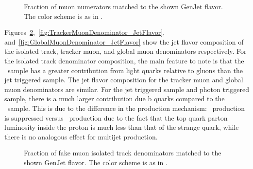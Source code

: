 \documentclass{cmspaper}
\begin{document}
\begin{figure}[htb]
\begin{center}
   \caption{Fraction of muon numerators matched to the shown GenJet flavor. The color scheme is as in .}
   \label{fig:MuonNumerator_JetFlavor}
\end{center}
\end{figure}


Figures~\ref{fig:IsoTrackMuonDenominator_JetFlavor},~\ref{fig:TrackerMuonDenominator_JetFlavor}, and~\ref{fig:GlobalMuonDenominator_JetFlavor} show the jet flavor composition of the isolated track, tracker muon, and global muon denominators respectively. For the isolated track denominator composition, the main feature to note is that the \WPlusJets\ sample has a greater contribution from light quarks relative to gluons than the jet triggered sample. The jet flavor composition for the tracker muon and global muon denominators are similar. For the jet triggered sample and photon triggered sample, there is a much larger contribution due b quarks compared to the \WPlusJets\ sample. This is due to the difference in the production mechanism: \Wb\ production is suppressed versus \Wc\ production due to the fact that the top quark parton luminosity inside the proton is much less than that of the strange quark, while there is no analogous effect for multijet production. 

\begin{figure}[htb]
\begin{center}

   \caption{Fraction of fake muon isolated track denominators matched to the shown GenJet flavor. The color scheme is as in .}
   \label{fig:IsoTrackMuonDenominator_JetFlavor}
\end{center}
\end{figure}
\end{document}
